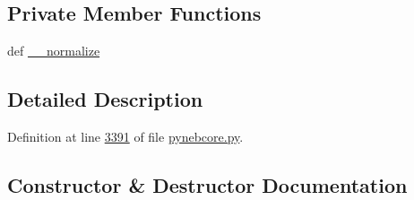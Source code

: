 \subsection*{Private Member Functions}
\begin{DoxyCompactItemize}
\item 
def \hyperlink{classpyneb_1_1core_1_1pynebcore_1_1_observation_a04ce20073b375a6dd7d4282933adbd93}{\+\_\+\+\_\+normalize}
\end{DoxyCompactItemize}


\subsection{Detailed Description}


Definition at line \hyperlink{pynebcore_8py_source_l03391}{3391} of file \hyperlink{pynebcore_8py_source}{pynebcore.\+py}.



\subsection{Constructor \& Destructor Documentation}
\hypertarget{classpyneb_1_1core_1_1pynebcore_1_1_observation_a4f72b542ac93dd5376e05c7c44015409}{}
